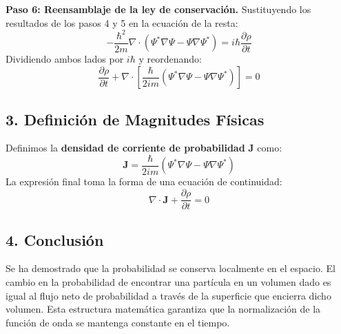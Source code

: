 \documentclass[a4paper]{article}
\begin{document}
\textbf{Paso 6: Reensamblaje de la ley de conservación.}
Sustituyendo los resultados de los pasos 4 y 5 en la ecuación de la resta:
\begin{equation}
    -\frac{\hbar^2}{2m} \nabla \cdot (\Psi^* \nabla\Psi - \Psi \nabla\Psi^*) = i\hbar \frac{\partial\rho}{\partial t}
\end{equation}
Dividiendo ambos lados por $i\hbar$ y reordenando:
\begin{equation}
    \frac{\partial\rho}{\partial t} + \nabla \cdot \left[ \frac{\hbar}{2im} (\Psi^* \nabla\Psi - \Psi \nabla\Psi^*) \right] = 0
\end{equation}

\subsection*{3. Definición de Magnitudes Físicas}
Definimos la \textbf{densidad de corriente de probabilidad} $\mathbf{J}$ como:
\begin{equation}
    \mathbf{J} = \frac{\hbar}{2im} (\Psi^* \nabla\Psi - \Psi \nabla\Psi^*)
\end{equation}
La expresión final toma la forma de una ecuación de continuidad:
\begin{equation}
    \nabla \cdot \mathbf{J} + \frac{\partial\rho}{\partial t} = 0
\end{equation}

\subsection*{4. Conclusión}
Se ha demostrado que la probabilidad se conserva localmente en el espacio. El cambio en la probabilidad de encontrar una partícula en un volumen dado es igual al flujo neto de probabilidad a través de la superficie que encierra dicho volumen. Esta estructura matemática garantiza que la normalización de la función de onda se mantenga constante en el tiempo.





 
\end{document}
